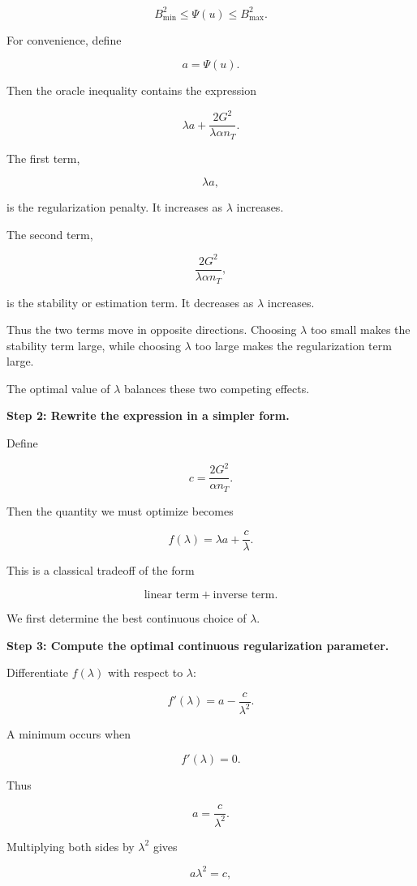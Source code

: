 \documentclass[11pt]{article}
\begin{document}
\begin{enumerate}
\begin{solutionbox}
\[
B_{\min}^2
\le
\Psi(u)
\le
B_{\max}^2.
\]

For convenience, define

\[
a=\Psi(u).
\]

Then the oracle inequality contains the expression

\[
\lambda a
+
\frac{2G^2}{\lambda\alpha n_T}.
\]

The first term,

\[
\lambda a,
\]

is the regularization penalty. It increases as $\lambda$ increases.

The second term,

\[
\frac{2G^2}{\lambda\alpha n_T},
\]

is the stability or estimation term. It decreases as $\lambda$ increases.

Thus the two terms move in opposite directions. Choosing $\lambda$ too small makes the stability term large, while choosing $\lambda$ too large makes the regularization term large.

The optimal value of $\lambda$ balances these two competing effects.

\medskip

\textbf{Step 2: Rewrite the expression in a simpler form.}

Define

\[
c
=
\frac{2G^2}{\alpha n_T}.
\]

Then the quantity we must optimize becomes

\[
f(\lambda)
=
\lambda a
+
\frac{c}{\lambda}.
\]

This is a classical tradeoff of the form

\[
\text{linear term}
+
\text{inverse term}.
\]

We first determine the best continuous choice of $\lambda$.

\medskip

\textbf{Step 3: Compute the optimal continuous regularization parameter.}

Differentiate $f(\lambda)$ with respect to $\lambda$:

\[
f'(\lambda)
=
a
-
\frac{c}{\lambda^2}.
\]

A minimum occurs when

\[
f'(\lambda)=0.
\]

Thus

\[
a
=
\frac{c}{\lambda^2}.
\]

Multiplying both sides by $\lambda^2$ gives

\[
a\lambda^2=c,
\]


\end{solutionbox}
\end{enumerate}
\end{document}
